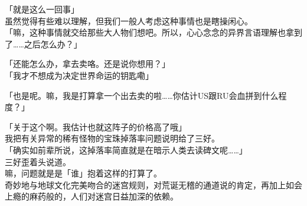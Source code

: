 「就是这么一回事」\\

虽然觉得有些难以理解，但我们一般人考虑这种事情也是瞎操闲心。\\

「嘛，这种事情就交给那些大人物们想吧。所以，心心念念的异界言语理解也拿到了……之后怎么办？」

「还能怎么办，拿去卖咯。还是说你想用？」\\

「我才不想成为决定世界命运的钥匙嘞」

「也是呢。嘛，我是打算拿一个出去卖的啦……你估计US跟RU会血拼到什么程度？」

「关于这个啊。我估计也就这阵子的价格高了哦」\\

我把有关异常的稀有怪物的宝珠掉落率问题说明给了三好。\\

「确实如前辈所说，这掉落率简直就是在暗示人类去读碑文呢……」\\

三好歪着头说道。\\

嘛，问题就是是「谁」抱着这样的打算了。\\

奇妙地与地球文化完美吻合的迷宫规则，对荒诞无稽的通道说的肯定，再加上如会上瘾的麻药般的，人们对迷宫日益加深的依赖。

